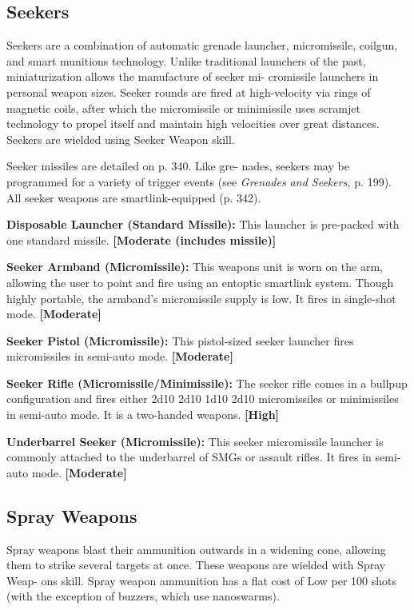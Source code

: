 \subsection{Seekers}

Seekers are a combination of automatic grenade 
launcher, micromissile, coilgun, and smart munitions 
technology. Unlike traditional launchers of the past, 
miniaturization allows the manufacture of seeker mi-
cromissile launchers in personal weapon sizes. Seeker 
rounds are fired at high-velocity via rings of magnetic 
coils, after which the micromissile or minimissile uses 
scramjet technology to propel itself and maintain high 
velocities over great distances. Seekers are wielded 
using Seeker Weapon skill.

Seeker missiles are detailed on p. 340. Like gre-
nades, seekers may be programmed for a variety of 
trigger events (see \textit{Grenades and Seekers,} p. 199). All 
seeker weapons are smartlink-equipped (p. 342).

\textbf{Disposable Launcher (Standard Missile):} This 
launcher is pre-packed with one standard missile. 
\textbf{[Moderate (includes missile)]}

\textbf{Seeker Armband (Micromissile):} This weapons unit 
is worn on the arm, allowing the user to point and 
fire using an entoptic smartlink system. Though highly 
portable, the armband's micromissile supply is low. It 
fires in single-shot mode. \textbf{[Moderate]}

\textbf{Seeker Pistol (Micromissile):} This pistol-sized 
seeker launcher fires micromissiles in semi-auto 
mode. \textbf{[Moderate]}

\textbf{Seeker Rifle (Micromissile/Minimissile):} The seeker 
rifle comes in a bullpup configuration and fires either 
2d10
2d10
1d10
2d10
micromissiles or minimissiles in semi-auto mode. It is 
a two-handed weapons. \textbf{[High]}

\textbf{Underbarrel Seeker (Micromissile):} This seeker 
micromissile launcher is commonly attached to the 
underbarrel of SMGs or assault rifles. It fires in semi-
auto mode. \textbf{[Moderate]}

\subsection{Spray Weapons}

Spray weapons blast their ammunition outwards in a 
widening cone, allowing them to strike several targets 
at once. These weapons are wielded with Spray Weap-
ons skill. Spray weapon ammunition has a flat cost 
of Low per 100 shots (with the exception of buzzers, 
which use nanoswarms).

